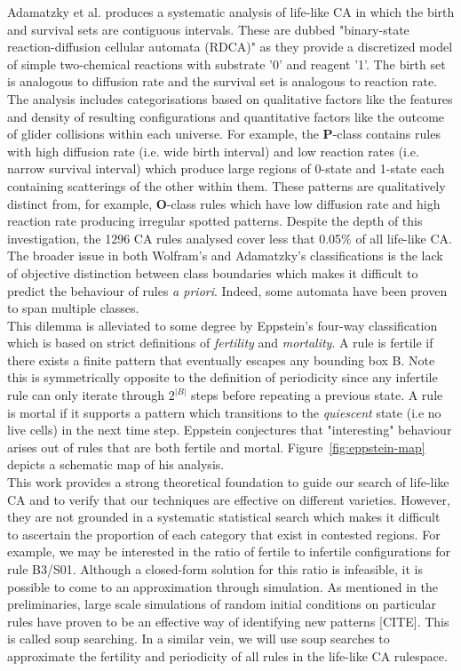 Adamatzky et al.\cite{adamatzky2006phenomenology} produces a systematic analysis of life-like CA in which the birth and survival sets are contiguous intervals. These are dubbed "binary-state reaction-diffusion cellular automata (RDCA)" as they provide a discretized model of simple two-chemical reactions with substrate '0' and reagent '1'. The birth set is analogous to diffusion rate and the survival set is analogous to reaction rate. The analysis includes categorisations based on qualitative factors like the features and density of resulting configurations and quantitative factors like the outcome of glider collisions within each universe. For example, the \textbf{P}-class contains rules with high diffusion rate (i.e. wide birth interval) and low reaction rates (i.e. narrow survival interval) which produce large regions of 0-state and 1-state each containing scatterings of the other within them. These patterns are qualitatively distinct from, for example, \textbf{O}-class rules which have low diffusion rate and high reaction rate producing irregular spotted patterns. Despite the depth of this investigation, the 1296 CA rules analysed cover less that 0.05\% of all life-like CA. The broader issue in both Wolfram's and Adamatzky's classifications is the lack of objective distinction between class boundaries which makes it difficult to predict the behaviour of rules \textit{a priori}. Indeed, some automata have been proven to span multiple classes\cite{baldwin1999classi}.\\

This dilemma is alleviated to some degree by Eppstein's four-way classification\cite{eppstein2010growth} which is based on strict definitions of \textit{fertility} and \textit{mortality}. A rule is fertile if there exists a finite pattern that eventually escapes any bounding box B. Note this is symmetrically opposite to the definition of periodicity since any infertile rule can only iterate through $2^{|B|}$ steps before repeating a previous state. A rule is mortal if it supports a pattern which transitions to the \textit{quiescent} state (i.e no live cells) in the next time step. Eppstein conjectures that "interesting" behaviour arises out of rules that are both fertile and mortal. Figure~\ref{fig:eppstein-map} depicts a schematic map of his analysis.\\

This work provides a strong theoretical foundation to guide our search of life-like CA and to verify that our techniques are effective on different varieties. However, they are not grounded in a systematic statistical search which makes it difficult to ascertain the proportion of each category that exist in contested regions. For example, we may be interested in the ratio of fertile to infertile configurations for rule B3/S01. Although a closed-form solution for this ratio is infeasible, it is possible to come to an approximation through simulation. As mentioned in the preliminaries, large scale simulations of random initial conditions on particular rules have proven to be an effective way of identifying new patterns [CITE]. This is called soup searching. In a similar vein, we will use soup searches to approximate the fertility and periodicity of all rules in the life-like CA rulespace.

